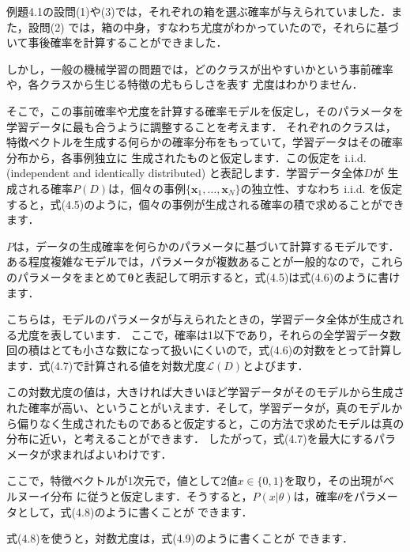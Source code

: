 例題4.1の設問(1)や(3)では，それぞれの箱を選ぶ確率が与えられていました．また，設問(2)
では，箱の中身，すなわち尤度がわかっていたので，それらに基づいて事後確率を計算することができました．


しかし，一般の機械学習の問題では，どのクラスが出やすいかという事前確率や，各クラスから生じる特徴の尤もらしさを表す
尤度はわかりません．

そこで，この事前確率や尤度を計算する確率モデルを仮定し，そのパラメータを学習データに最も合うように調整することを考えます．
それぞれのクラスは，特徴ベクトルを生成する何らかの確率分布をもっていて，学習データはその確率分布から，各事例独立に
生成されたものと仮定します．この仮定を
i.i.d. (independent and identically distributed) 
と表記します．学習データ全体$D$が
生成される確率$P(D)$は，個々の事例$\{\bm{x}_1,\dots,\bm{x}_N\}$の独立性、すなわち i.i.d. を仮定すると，式(4.5)のように，個々の事例が生成される確率の積で求めることができます．


$P$は，データの生成確率を何らかのパラメータに基づいて計算するモデルです．ある程度複雑なモデルでは，パラメータが複数あることが一般的なので，これらのパラメータをまとめて$\bm{\theta}$と表記して明示すると，式(4.5)は式(4.6)のように書けます．



こちらは，モデルのパラメータが与えられたときの，学習データ全体が生成される尤度を表しています．
ここで，確率は1以下であり，それらの全学習データ数回の積はとても小さな数になって扱いにくいので，式(4.6)の対数をとって計算します．式(4.7)で計算される値を対数尤度$\mathcal{L}(D)$とよびます．


この対数尤度の値は，大きければ大きいほど学習データがそのモデルから生成された確率が高い、ということがいえます．そして，学習データが，真のモデルから偏りなく生成されたものであると仮定すると，この方法で求めたモデルは真の分布に近い，と考えることができます．
したがって，式(4.7)を最大にするパラメータが求まればよいわけです．


ここで，特徴ベクトルが1次元で，値として2値$x \in \{0,1\}$を取り，その出現がベルヌーイ分布
に従うと仮定します．そうすると，$P(x|\theta)$は，確率$\theta$をパラメータとして，式(4.8)のように書くことが
できます．


式(4.8)を使うと，対数尤度は，式(4.9)のように書くことが
できます．

